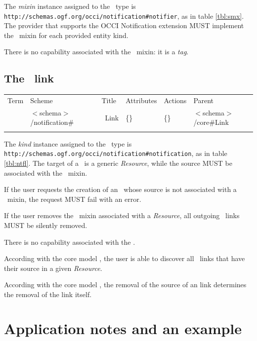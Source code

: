 \documentclass[10pt,a4paper]{article}
\begin{document}
The {\em mixin} instance assigned to the \smx\ type is {\tt http://schemas.ogf.org/occi/notification\#notifier}, as in table \ref{tbl:smx}. The provider that supports the OCCI Notification extension MUST implement the \smx\ mixin for each provided entity kind.

There is no capability associated with the \smx\ mixin: it is a {\em tag}.

\subsection{The \ntfl\ link} 

 {
	\begin{tabular}{llllll}
	\toprule
	Term & Scheme & Title & Attributes & Actions & Parent \\
	\colrule
	\ntfl &  $<$schema$>$/notification\# & \ntfl\ Link
	& \{\} & \{\} & $<$schema$>$/core\#Link\\
	\botrule
	\end{tabular}
}

The {\em kind} instance assigned to the \ntfl\ type is {\tt http://schemas.ogf.org/occi/notification\#notification}, as in table \ref{tbl:ntfl}. The target of a \ntfl\ is a generic {\em Resource}, while the source MUST be associated with the \smx\ mixin. 

If the user requests the creation of an \ntfl\ whose source is not associated with a \smx\ mixin, the request MUST fail with an error.

If the user removes the \ntfl\ mixin associated with a {\em Resource}, all outgoing \ntfl\ links MUST be silently removed.

There is no capability associated with the \ntfl.

According with the core model \cite{occi:core}, the user is able to discover all \ntfl\ links that have their source in a given {\em Resource}.

According with the core model \cite{occi:core}, the removal of the source of an \ntfl link determines the removal of the link itself.

\section{Application notes and an example}
\end{document}
